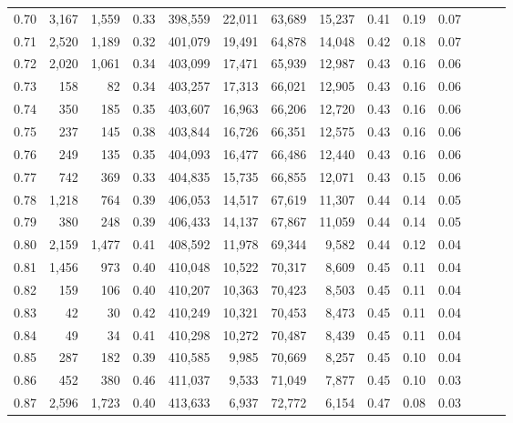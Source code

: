 \begin{tabular}{rrrrrrrrrrrrrr}
0.70 &   3,167 &  1,559 &  0.33 &  398,559 &   22,011 &  63,689 &  15,237 &  0.41 &  0.19 &      0.07 \\
0.71 &   2,520 &  1,189 &  0.32 &  401,079 &   19,491 &  64,878 &  14,048 &  0.42 &  0.18 &      0.07 \\
0.72 &   2,020 &  1,061 &  0.34 &  403,099 &   17,471 &  65,939 &  12,987 &  0.43 &  0.16 &      0.06 \\
0.73 &     158 &     82 &  0.34 &  403,257 &   17,313 &  66,021 &  12,905 &  0.43 &  0.16 &      0.06 \\
0.74 &     350 &    185 &  0.35 &  403,607 &   16,963 &  66,206 &  12,720 &  0.43 &  0.16 &      0.06 \\
0.75 &     237 &    145 &  0.38 &  403,844 &   16,726 &  66,351 &  12,575 &  0.43 &  0.16 &      0.06 \\
0.76 &     249 &    135 &  0.35 &  404,093 &   16,477 &  66,486 &  12,440 &  0.43 &  0.16 &      0.06 \\
0.77 &     742 &    369 &  0.33 &  404,835 &   15,735 &  66,855 &  12,071 &  0.43 &  0.15 &      0.06 \\
0.78 &   1,218 &    764 &  0.39 &  406,053 &   14,517 &  67,619 &  11,307 &  0.44 &  0.14 &      0.05 \\
0.79 &     380 &    248 &  0.39 &  406,433 &   14,137 &  67,867 &  11,059 &  0.44 &  0.14 &      0.05 \\
0.80 &   2,159 &  1,477 &  0.41 &  408,592 &   11,978 &  69,344 &   9,582 &  0.44 &  0.12 &      0.04 \\
0.81 &   1,456 &    973 &  0.40 &  410,048 &   10,522 &  70,317 &   8,609 &  0.45 &  0.11 &      0.04 \\
0.82 &     159 &    106 &  0.40 &  410,207 &   10,363 &  70,423 &   8,503 &  0.45 &  0.11 &      0.04 \\
0.83 &      42 &     30 &  0.42 &  410,249 &   10,321 &  70,453 &   8,473 &  0.45 &  0.11 &      0.04 \\
0.84 &      49 &     34 &  0.41 &  410,298 &   10,272 &  70,487 &   8,439 &  0.45 &  0.11 &      0.04 \\
0.85 &     287 &    182 &  0.39 &  410,585 &    9,985 &  70,669 &   8,257 &  0.45 &  0.10 &      0.04 \\
0.86 &     452 &    380 &  0.46 &  411,037 &    9,533 &  71,049 &   7,877 &  0.45 &  0.10 &      0.03 \\
0.87 &   2,596 &  1,723 &  0.40 &  413,633 &    6,937 &  72,772 &   6,154 &  0.47 &  0.08 &      0.03 \\

\end{tabular}
